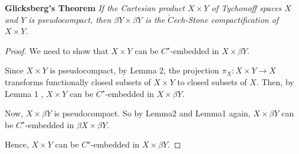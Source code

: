 \documentclass{amsart}
\author{shaun yi cheng}
\begin{document}
\textbf{Glicksberg's Theorem}
\emph{If the Cartesian product $X\times Y$ of Tychonoff spaces $X$ and $Y$ is pseudocompact, then $\beta Y \times \beta Y $ is the $\check{C}$ech-Stone compactification of $X\times Y$.}
\begin{proof}
We need to show that $X\times Y$ can be $C^\star$-embedded  in $X\times \beta Y$. 

Since $X\times Y$ is pseudocompact, by Lemma 2, the projection $\pi_X: X\times Y \rightarrow X$ transforms functionally closed subsets of $X\times Y$ to closed subsets of $X$. Then, by Lemma 1 , $X\times Y$ can be $C^\star$-embedded in $X\times \beta Y$. 


Now, $X\times \beta Y$ is pseudocompact. So by Lemma2 and Lemma1 again, $X\times \beta Y$ can be $C^\star$-embedded in $\beta X\times \beta Y$.  

Hence, $X \times Y$ can be $C^\star$-embedded  in $X\times \beta Y$.




\end{proof}
\end{document}
